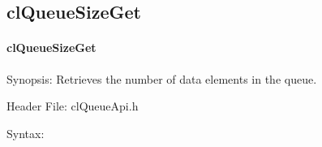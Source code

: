 \begin{flushleft}
\subsection{clQueueSizeGet}
\hypertarget{pageq105}{}\paragraph{cl\-Queue\-Size\-Get}\label{pageq105}
\begin{Desc}
\item[Synopsis:]Retrieves the number of data elements in the queue.\end{Desc}
\begin{Desc}
\item[Header File:]clQueueApi.h\end{Desc}
\begin{Desc}
\item[Syntax:]


\end{Desc}
\end{flushleft}
